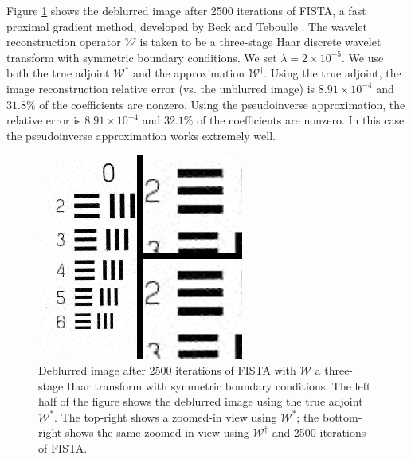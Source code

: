 \documentclass[journal]{IEEEtran}
\begin{document}
Figure \ref{fig:compare_db1_sym} shows the deblurred image after 2500 iterations of FISTA, a fast proximal gradient method, developed by Beck and Teboulle \cite{beck_2009}.  The wavelet reconstruction operator $\mathcal{W}$ is taken to be a three-stage Haar discrete wavelet transform with symmetric boundary conditions.  We set $\lambda=2\times 10^{-5}$.  We use both the true adjoint $\mathcal{W}^\ast$ and the approximation $\mathcal{W}^\dagger$.  Using the true adjoint, the image reconstruction relative error (vs. the unblurred image) is $8.91\times10^{-4}$ and $31.8\%$ of the coefficients are nonzero.  Using the pseudoinverse approximation, the relative error is $8.91\times 10^{-4}$ and $32.1\%$ of the coefficients are nonzero.  In this case the pseudoinverse approximation works extremely well.

\begin{figure}
   \centering
   \includegraphics[width=0.8\columnwidth]{figures/compare_db1_sym_2500.png}
   \caption{Deblurred image after 2500 iterations of FISTA with $\mathcal{W}$ a three-stage Haar transform with symmetric boundary conditions.  The left half of the figure shows the deblurred image using the true adjoint $\mathcal{W}^\ast$.  The top-right shows a zoomed-in view using $\mathcal{W}^\ast$; the bottom-right shows the same zoomed-in view using $\mathcal{W}^\dagger$ and 2500 iterations of FISTA.}
   \label{fig:compare_db1_sym}
\end{figure}
\end{document}
